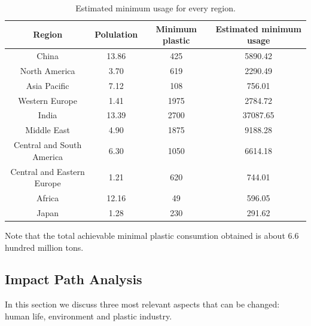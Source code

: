 \documentclass{mcmthesis}
\begin{document}
\begin{table}[]
	\center
	\caption{Estimated minimum usage for every region.}
	\label{emu}
	\begin{tabular}{|c|c|c|c|}
		\hline
		Region                     & Polulation & Minimum plastic & Estimated minimum usage \\ \hline
		China                      & 13.86      & 425                            & 5890.42                              \\ \hline
		North America              & 3.70       & 619                            & 2290.49                              \\ \hline
		Asia Pacific               & 7.12       & 108                            & 756.01                               \\ \hline
		Western Europe             & 1.41       & 1975                           & 2784.72                              \\ \hline
		India                      & 13.39      & 2700                           & 37087.65                             \\ \hline
		Middle East                & 4.90       & 1875                           & 9188.28                              \\ \hline
		Central and South America  & 6.30       & 1050                           & 6614.18                              \\ \hline
		Central and Eastern Europe & 1.21       & 620                            & 744.01                               \\ \hline
		Africa                     & 12.16      & 49                             & 596.05                               \\ \hline
		Japan                      & 1.28       & 230                            & 291.62                               \\ \hline
	\end{tabular}
\end{table}

Note that the total achievable minimal plastic consumtion obtained is about 6.6 hundred million tons.

\subsection{Impact Path Analysis}

In this section we discuss three most relevant aspects that can be changed: human life, environment and plastic industry.
\end{document}
